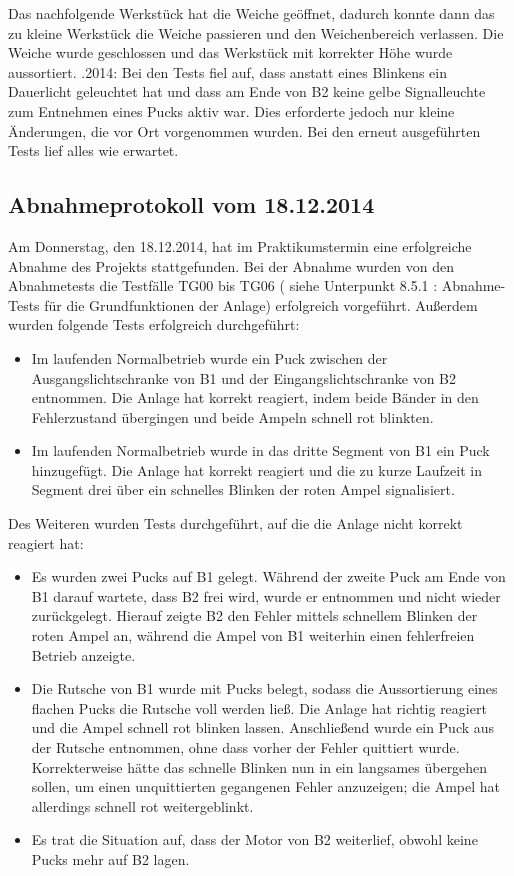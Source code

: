 \documentclass[oneside,a4paper,titlepage]{scrartcl}              %
\begin{document}
Das nachfolgende Werkstück hat die Weiche geöffnet, dadurch konnte dann das zu kleine Werkstück die Weiche passieren und den Weichenbereich verlassen. Die Weiche wurde geschlossen
und das Werkstück mit korrekter Höhe wurde aussortiert. \newline{}.2014: Bei den Tests fiel auf, dass anstatt eines Blinkens ein Dauerlicht geleuchtet hat und dass am Ende von B2 keine gelbe Signalleuchte zum Entnehmen eines Pucks aktiv war. Dies erforderte jedoch nur kleine Änderungen, die vor Ort vorgenommen wurden. Bei den erneut ausgeführten Tests lief alles wie erwartet.\newline\newline
\newpage

\subsection{Abnahmeprotokoll vom 18.12.2014}
Am Donnerstag, den 18.12.2014, hat im Praktikumstermin eine erfolgreiche Abnahme des Projekts stattgefunden.\newline
Bei der Abnahme wurden von den Abnahmetests die Testfälle TG00 bis TG06 ( siehe Unterpunkt 8.5.1 : Abnahme-Tests für die Grundfunktionen der Anlage) erfolgreich vorgeführt. \newline
Außerdem wurden folgende Tests erfolgreich durchgeführt: 
\begin{itemize}
    \item Im laufenden Normalbetrieb wurde ein Puck zwischen der Ausgangslichtschranke von B1 und der Eingangslichtschranke von B2 entnommen. Die Anlage hat korrekt reagiert, indem beide Bänder in den Fehlerzustand übergingen und beide Ampeln schnell rot blinkten. 
    \item Im laufenden Normalbetrieb wurde in das dritte Segment von B1 ein Puck hinzugefügt. Die Anlage hat korrekt reagiert und die zu kurze Laufzeit in Segment drei über ein schnelles Blinken der roten Ampel signalisiert. 
\end{itemize}
Des Weiteren wurden Tests durchgeführt, auf die die Anlage nicht korrekt reagiert hat:
\begin{itemize}
    \item Es wurden zwei Pucks auf B1 gelegt. Während der zweite Puck am Ende von B1 darauf wartete, dass B2 frei wird, wurde er entnommen und nicht wieder zurückgelegt. Hierauf zeigte B2 den Fehler mittels schnellem Blinken der roten Ampel an, während die Ampel von B1 weiterhin einen fehlerfreien Betrieb anzeigte.
    \item Die Rutsche von B1 wurde mit Pucks belegt, sodass die Aussortierung eines flachen Pucks die Rutsche voll werden ließ. Die Anlage hat richtig reagiert und die Ampel schnell rot blinken lassen. Anschließend wurde ein Puck aus der Rutsche entnommen, ohne dass vorher der Fehler quittiert wurde. Korrekterweise hätte das schnelle Blinken nun in ein langsames übergehen sollen, um einen unquittierten gegangenen Fehler anzuzeigen; die Ampel hat allerdings schnell rot weitergeblinkt.
    \item Es trat die Situation auf, dass der Motor von B2 weiterlief, obwohl keine Pucks mehr auf B2 lagen.
\end{itemize}
\end{document}
